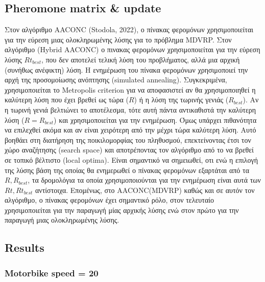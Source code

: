 \documentclass{article}
\begin{document}
	\subsection{Pheromone matrix \& update}
    Στον αλγόριθμο AACONC (Stodola, 2022), ο πίνακας φερομόνων χρησιμοποιείται για την εύρεση μιας ολοκληρωμένης λύσης για το πρόβλημα MDVRP.  Στον αλγόριθμο (Hybrid AACONC) ο πινακας φερομόνων χρησιμοποιείται για την εύρεση λύσης $Rt_{best}$, που δεν αποτελεί τελική λύση του προβλήματος, αλλά μια αρχική (συνήθως ανέφικτη) λύση. 
	Η ενημέρωση του πίνακα φερομόνων χρησιμοποιεί την αρχή της προσομοίωσης ανόπτησης (simulated annealing). Συγκεκριμένα, χρησιμοποιείται το Metropolis criterion για να αποφασιστεί αν θα χρησιμοποιηθεί η καλύτερη λύση που έχει βρεθεί ως τώρα ($R$) ή η λύση της τωρινής γενιάς ($R_{best}$). Αν η τωρινή γενιά βελτιώνει το αποτέλεσμα, τότε αυτή πάντα αντικαθιστά την καλύτερη λύση ($R=R_{best}$) και χρησιμοποιείται για την ενημέρωση. Όμως υπάρχει πιθανότητα να επιλεχθεί ακόμα και αν είναι χειρότερη από την μέχρι τώρα καλύτερη λύση. Αυτό βοηθάει στη διατήρηση της ποικιλομορφίας του πληθυσμού, επεκτείνοντας έτσι τον χώρο αναζήτησης (search space) και αποτρέποντας τον αλγόριθμο από το να βρεθεί σε τοπικό βέλτιστο (local optima).
	Είναι σημαντικό να σημειωθεί, οτι ενώ η επιλογή της λύσης βάση της οποίας θα ενημερωθεί ο πίνακας φερομόνων εξαρτάται από τα $R,R_{best}$, τα δρομολόγια τα οποία χρησιμοποιούνται για την ενημέρωση είναι αυτά των $Rt,Rt_{best}$ αντίστοιχα. Επομένως, στο AACONC(MDVRP)  καθώς και σε αυτόν τον αλγόριθμο, ο πίνακας φερομόνων έχει σημαντικό ρόλο, στον τελευταίο χρησιμοποιείται για την παραγωγή μίας αρχικής λύσης ενώ στον πρώτο για την παραγωγή μιας ολοκληρωμένης λύσης.
	\newpage
	\subsection{Results}
	\subsubsection{Motorbike speed = 20}
	\;
	\;
	\;
	\;
	\newpage
\end{document}
